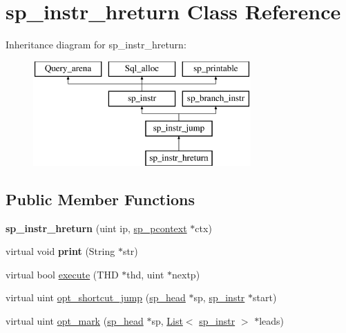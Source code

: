 \hypertarget{classsp__instr__hreturn}{}\section{sp\+\_\+instr\+\_\+hreturn Class Reference}
\label{classsp__instr__hreturn}
Inheritance diagram for sp\+\_\+instr\+\_\+hreturn\+:\begin{figure}[H]
\begin{center}
\leavevmode
\includegraphics[height=4.000000cm]{classsp__instr__hreturn}
\end{center}
\end{figure}
\subsection*{Public Member Functions}
\begin{DoxyCompactItemize}
\item 
\mbox{\label{classsp__instr__hreturn_aa1f8dd94925b56b01467d2b812e6e7b2}} 
{\bfseries sp\+\_\+instr\+\_\+hreturn} (uint ip, \mbox{\hyperlink{classsp__pcontext}{sp\+\_\+pcontext}} $\ast$ctx)
\item 
\mbox{\label{classsp__instr__hreturn_a0f0ed5a58a488054ff64bd1a42799cb4}} 
virtual void {\bfseries print} (String $\ast$str)
\item 
virtual bool \mbox{\hyperlink{classsp__instr__hreturn_a8491a8712319d0ba1b698c18ae4d8b48}{execute}} (T\+HD $\ast$thd, uint $\ast$nextp)
\item 
virtual uint \mbox{\hyperlink{classsp__instr__hreturn_aad1c6b1378f1f2f26fb3be33622f0ce2}{opt\+\_\+shortcut\+\_\+jump}} (\mbox{\hyperlink{classsp__head}{sp\+\_\+head}} $\ast$sp, \mbox{\hyperlink{classsp__instr}{sp\+\_\+instr}} $\ast$start)
\item 
virtual uint \mbox{\hyperlink{classsp__instr__hreturn_a2154f9d995bbd7aa47b0fe714ef3c33f}{opt\+\_\+mark}} (\mbox{\hyperlink{classsp__head}{sp\+\_\+head}} $\ast$sp, \mbox{\hyperlink{classList}{List}}$<$ \mbox{\hyperlink{classsp__instr}{sp\+\_\+instr}} $>$ $\ast$leads)
\end{DoxyCompactItemize}
